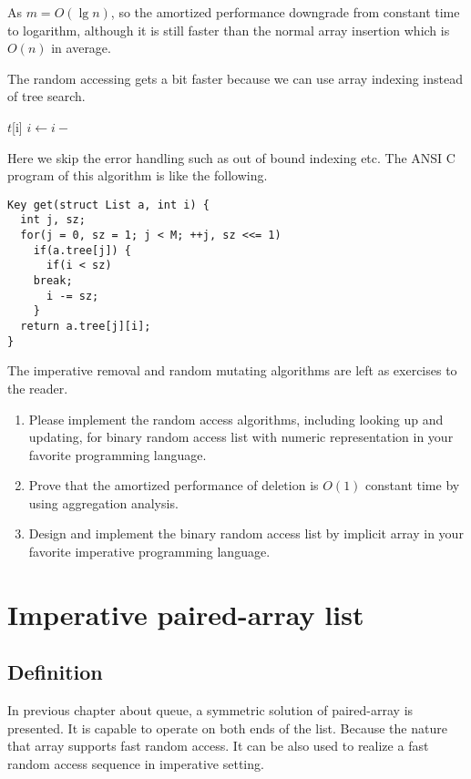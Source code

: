 \documentclass[UTF8]{article}
\begin{document}
As $m = O(\lg n)$, so the amortized performance downgrade from constant time to logarithm,
although it is still faster than the normal array insertion which is $O(n)$ in average.

The random accessing gets a bit faster because we can use array indexing instead of tree
search.

\begin{algorithmic}
        \State \Return $t$[i]
      \Else
        \State $i \gets i -$ 
      \EndIf
    \EndIf
  \EndFor
\EndFunction
\end{algorithmic}

Here we skip the error handling such as out of bound indexing etc. The ANSI C program
of this algorithm is like the following.

\begin{lstlisting}
Key get(struct List a, int i) {
  int j, sz;
  for(j = 0, sz = 1; j < M; ++j, sz <<= 1)
    if(a.tree[j]) {
      if(i < sz)
	break;
      i -= sz;
    }
  return a.tree[j][i];
}
\end{lstlisting}

The imperative removal and random mutating algorithms are left as exercises to the reader.

\begin{Exercise}
\begin{enumerate}
\item Please implement the random access algorithms, including looking up and updating,
for binary random access list with numeric representation in your favorite programming
language.

\item Prove that the amortized performance of deletion is $O(1)$ constant time by
using aggregation analysis.

\item Design and implement the binary random access list by implicit array in your
favorite imperative programming language.
\end{enumerate}
\end{Exercise}

\section{Imperative paired-array list}

\subsection{Definition}
In previous chapter about queue, a symmetric solution of paired-array is presented.
It is capable to operate on both ends of the list. Because the nature that array supports
fast random access. It can be also used to realize a fast random access sequence
in imperative setting.
\end{document}
